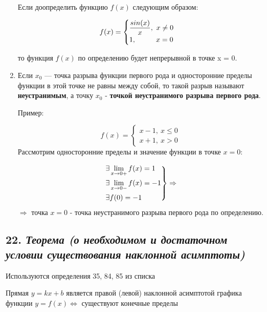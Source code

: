 \begin{enumerate}
Если доопределить функцию $f(x)$ следующим образом:

$$f(x) = 
    \begin{cases}
        {\dfrac{sin(x)}{x}},\ x \neq 0\\
        1, \hspace*{28pt} x = 0
    \end{cases}
    $$

то функция $f(x)$ по определению будет непрерывной в точке x = 0.
\item Если $x_0$ — точка разрыва функции первого рода и односторонние пределы функции в этой точке не равны между собой, то такой разрыв называют \textbf{неустранимым}, а точку $x_0$ - \textbf{точкой неустранимого разрыва первого рода}.

Пример:

$$f(x) = 
    \begin{cases}
        x - 1,\ x \leqslant 0\\
        x + 1, \  x > 0
    \end{cases}
    $$ Рассмотрим односторонние пределы и значение функции в точке $x = 0$:

$$\begin{rcases}
        \exists\lim\limits_{x \rightarrow 0+}f(x) = 1\\
        \exists\lim\limits_{x \rightarrow 0-}f(x) = -1\\
        \exists f(0) = -1
    \end{rcases} 
    \Rightarrow
    $$

$$\Rightarrow \text{ точка }x = 0 \text{ - точка неустранимого разрыва первого рода по определению.}
    $$

\end{enumerate}
\newpage 
\subsection*{22. \textit{Теорема (о необходимом и достаточном условии существования наклонной асимптоты)}}
\begin{Quote2} 
\small\centering 

Используются определения 35, 84, 85 из списка \end{Quote2} 

Прямая $y = kx + b$ является правой (левой) наклонной асимптотой графика функции $y = f(x) \iff$ существуют конечные пределы

